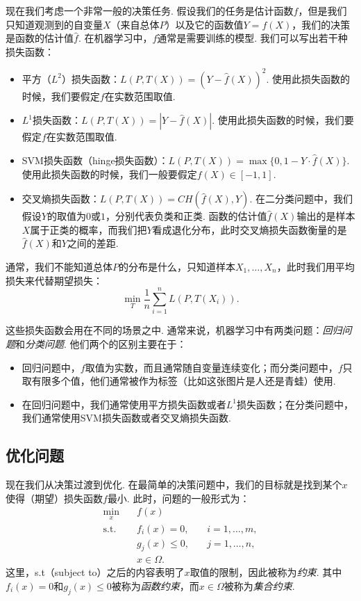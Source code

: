 现在我们考虑一个非常一般的决策任务. 假设我们的任务是估计函数$f$，但是我们只知道观测到的自变量$X$（来自总体$P$）以及它的函数值$Y=f(X)$，我们的决策是函数的估计值$\hat f$. 在机器学习中，$f$通常是需要训练的模型. 我们可以写出若干种损失函数：
\begin{itemize}
    \item 平方（$L^2$）损失函数：$L(P,T(X))=(Y-\hat f(X))^2$. 使用此损失函数的时候，我们要假定$f$在实数范围取值. 
    \item $L^1$损失函数：$L(P,T(X))=|Y-\hat f(X)|$. 使用此损失函数的时候，我们要假定$f$在实数范围取值. 
    \item SVM损失函数（hinge损失函数）：$L(P,T(X))=\max\{0,1-Y\cdot\hat f(X)\}$. 使用此损失函数的时候，我们一般要假定$f(X)\in[-1,1]$. 
    \item 交叉熵损失函数：$L(P,T(X))=CH(\hat f(X),Y)$. 在二分类问题中，我们假设$Y$的取值为$0$或$1$，分别代表负类和正类. 函数的估计值$\hat f (X)$输出的是样本$X$属于正类的概率，而我们把$Y$看成退化分布，此时交叉熵损失函数衡量的是$\hat f(X)$和$Y$之间的差距.
\end{itemize}

通常，我们不能知道总体$P$的分布是什么，只知道样本$X_1,\dots,X_n$，此时我们用平均损失来代替期望损失：
    \[\min_{T}\frac{1}{n}\sum_{i=1}^n L(P,T(X_i)).\]

这些损失函数会用在不同的场景之中. 通常来说，机器学习中有两类问题：\emph{回归问题}和\emph{分类问题}. 他们两个的区别主要在于：
\begin{itemize}
    \item 回归问题中，$f$取值为实数，而且通常随自变量连续变化；而分类问题中，$f$只取有限多个值，他们通常被作为标签（比如这张图片是人还是青蛙）使用.
    \item 在回归问题中，我们通常使用平方损失函数或者$L^1$损失函数；在分类问题中，我们通常使用SVM损失函数或者交叉熵损失函数.
\end{itemize}

\subsection{优化问题}
现在我们从决策过渡到优化. 在最简单的决策问题中，我们的目标就是找到某个$x$使得（期望）损失函数$f$最小. 此时，问题的一般形式为：
\begin{equation}
\begin{alignedat}{2}
\min_{x}&\quad f(x)\\
\text{s.t.}&\quad f_i(x)=0,&\quad i=1,\dots,m,\\
&\quad g_j(x)\leq 0,&\quad j=1,\dots,n,\\
&\quad x\in\Omega.
\end{alignedat}
\label{eq:opt-general}
\end{equation}
这里，s.t（subject to）之后的内容表明了$x$取值的限制，因此被称为\emph{约束}. 其中$f_i(x)=0$和$g_j(x)\leq 0$被称为\emph{函数约束}，而$x\in\Omega$被称为\emph{集合约束}.

